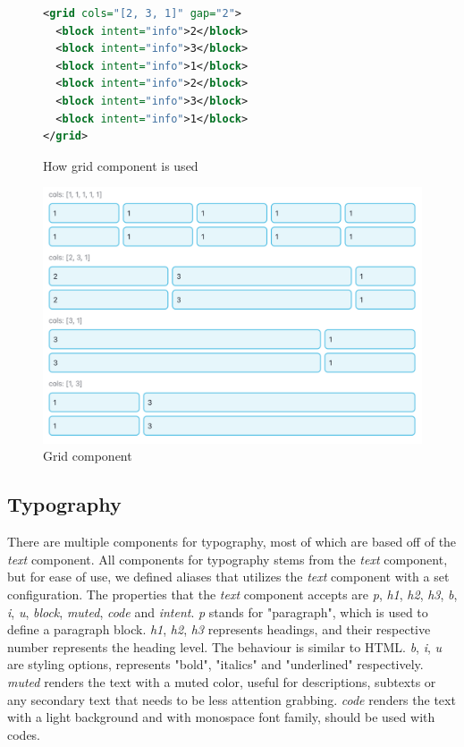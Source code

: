 \begin{figure}
\begin{minipage}{\linewidth}
\begin{lstlisting}[language=xml]
<grid cols="[2, 3, 1]" gap="2">
  <block intent="info">2</block>
  <block intent="info">3</block>
  <block intent="info">1</block>
  <block intent="info">2</block>
  <block intent="info">3</block>
  <block intent="info">1</block>
</grid>
\end{lstlisting}
\end{minipage}
\caption{How grid component is used}%
\label{fig:grid_xml}%
\end{figure}

\begin{figure}
  \centering
  \includegraphics[width=13cm]{thesis/paper/images/grid.png}
  \caption{Grid component}%
  \label{fig:grid}%
\end{figure}

\subsection{Typography}

There are multiple components for typography, most of which are based off of the \textit{text} component. All components for typography stems from the \textit{text} component, but for ease of use, we defined aliases that utilizes the \textit{text} component with a set configuration. The properties that the \textit{text} component accepts are \textit{p}, \textit{h1}, \textit{h2}, \textit{h3}, \textit{b}, \textit{i}, \textit{u}, \textit{block}, \textit{muted}, \textit{code} and \textit{intent}. \textit{p} stands for "paragraph", which is used to define a paragraph block. \textit{h1}, \textit{h2}, \textit{h3} represents headings, and their respective number represents the heading level. The behaviour is similar to HTML. \textit{b}, \textit{i}, \textit{u} are styling options, represents "bold", "italics" and "underlined" respectively. \textit{muted} renders the text with a muted color, useful for descriptions, subtexts or any secondary text that needs to be less attention grabbing. \textit{code} renders the text with a light background and with monospace font family, should be used with codes. 

